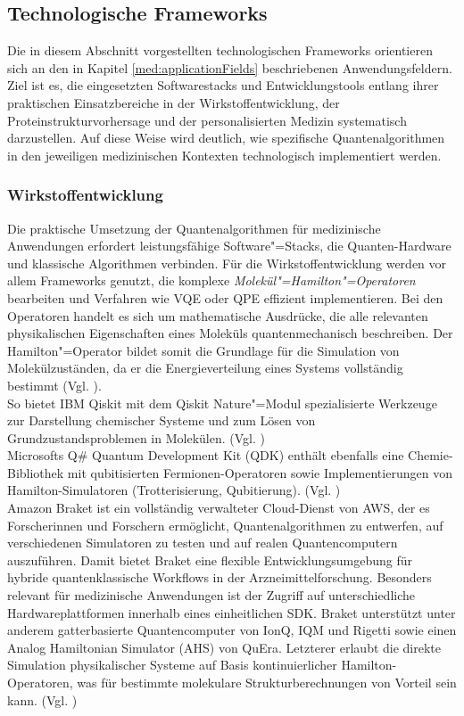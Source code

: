 \subsection{Technologische Frameworks}
Die in diesem Abschnitt vorgestellten technologischen Frameworks orientieren sich an den in Kapitel \ref{med:applicationFields} beschriebenen Anwendungsfeldern. Ziel ist es, die eingesetzten Softwarestacks und Entwicklungstools entlang ihrer praktischen Einsatzbereiche in der Wirkstoffentwicklung, der Proteinstrukturvorhersage und der personalisierten Medizin systematisch darzustellen. Auf diese Weise wird deutlich, wie spezifische Quantenalgorithmen in den jeweiligen medizinischen Kontexten technologisch implementiert werden.\\

\subsubsection*{Wirkstoffentwicklung}
Die praktische Umsetzung der Quantenalgorithmen für medizinische Anwendungen erfordert leistungsfähige Software"=Stacks, die Quanten-Hardware und klassische Algorithmen verbinden. Für die Wirkstoffentwicklung werden vor allem Frameworks genutzt, die komplexe \textit{Molekül"=Hamilton"=Operatoren} bearbeiten und Verfahren wie VQE oder QPE effizient implementieren. Bei den Operatoren handelt es sich um mathematische Ausdrücke, die alle relevanten physikalischen Eigenschaften eines Moleküls quantenmechanisch beschreiben. Der Hamilton"=Operator bildet somit die Grundlage für die Simulation von Molekülzuständen, da er die Energieverteilung eines Systems vollständig bestimmt (Vgl. \cite{mcardle}).\\

So bietet IBM Qiskit mit dem Qiskit Nature"=Modul spezialisierte Werkzeuge zur Darstellung chemischer Systeme und zum Lösen von Grundzustandsproblemen in Molekülen. (Vgl. \cite{noauthor_qiskit_2022})\\

Microsofts Q\# Quantum Development Kit (QDK) enthält ebenfalls eine Chemie-Bibliothek mit qubitisierten Fermionen-Operatoren sowie Implementierungen von Hamilton-Simulatoren (Trotterisierung, Qubitierung). (Vgl. \cite{msazure}) \\

Amazon Braket ist ein vollständig verwalteter Cloud-Dienst von AWS, der es Forscherinnen und Forschern ermöglicht, Quantenalgorithmen zu entwerfen, auf verschiedenen Simulatoren zu testen und auf realen Quantencomputern auszuführen. Damit bietet Braket eine flexible Entwicklungsumgebung für hybride quantenklassische Workflows in der Arzneimittelforschung. Besonders relevant für medizinische Anwendungen ist der Zugriff auf unterschiedliche Hardwareplattformen innerhalb eines einheitlichen SDK. Braket unterstützt unter anderem gatterbasierte Quantencomputer von IonQ, IQM und Rigetti sowie einen Analog Hamiltonian Simulator (AHS) von QuEra. Letzterer erlaubt die direkte Simulation physikalischer Systeme auf Basis kontinuierlicher Hamilton-Operatoren, was für bestimmte molekulare Strukturberechnungen von Vorteil sein kann. (Vgl. \cite{amazonbraket})\\

